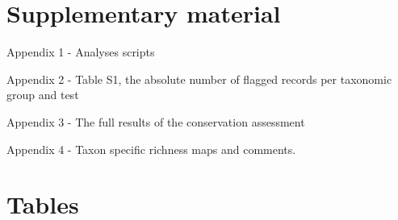 \documentclass[
  12pt,
]{article}
\begin{document}
\hypertarget{supplementary-material}{%
\section{Supplementary material}\label{supplementary-material}}

Appendix 1 - Analyses scripts

Appendix 2 - Table S1, the absolute number of flagged records per taxonomic group and test

Appendix 3 - The full results of the conservation assessment

Appendix 4 - Taxon specific richness maps and comments.

\newpage{}

\hypertarget{tables}{%
\section{Tables}\label{tables}}
\end{document}
